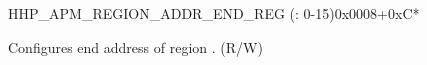 \begin{register}{H}{HP\_APM\_REGION\_ADDR\_END\_REG (: 0-15)}{0x0008+0xC*}\label{regdesc:HPAPMREGION0ADDRENDREG}
%
\regnewline%
\begin{regdesc}\begin{reglist}
\label{fielddesc:HPAPMREGION0ADDREND}\item [HP\_APM\_REGION\regindex{n}\_ADDR\_END] Configures end address of region . (R/W)
\end{reglist}\end{regdesc}
\end{register}

































































